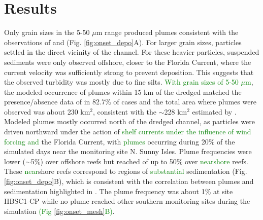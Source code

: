 \documentclass[preprint,12pt,authoryear]{elsarticle}
\newcommand{\modif}[1]{\textcolor{green}{#1}}
\begin{document}
\section{Results}

Only grain sizes in the 5-50 $\mu$m range produced plumes consistent with the observations of \cite{barnes2015sediment} and \cite{cunning2019extensive} (Fig. \ref{fig:onset_depo}A). For larger grain sizes, particles settled in the direct vicinity of the channel. For these heavier particles, suspended sediments were only observed offshore, closer to the Florida Current, where the current velocity was sufficiently strong to prevent deposition. This suggests that the observed turbidity was mostly due to fine silts. \modif{With grain sizes of 5-50 $\mu$m}, the modeled occurrence of plumes  within 15 km of the dredged matched the presence/absence data of \cite{cunning2019extensive} in 82.7\% of cases and the total area where plumes were observed was about 230 km$^2$, consistent with the $\sim$228 km$^2$ estimated by \cite{barnes2015sediment}. Modeled plumes mostly occurred north of the dredged channel, as particles were driven northward under the action of \modif{shelf currents under the influence of wind forcing and} the Florida Current, with \modif{plumes} occurring during 20\% of the simulated days near the monitoring site N. Sunny Isles. Plume frequencies were lower ($\sim$5\%) over offshore reefs but reached of up to 50\% over \modif{nearshore} reefs. These \modif{near}shore reefs correspond to regions of \modif{substantial} sedimentation (Fig. \ref{fig:onset_depo}B), which is consistent with the correlation between plumes and sedimentation highlighted in \cite{cunning2019extensive}. The plume frequency was about 1\% at site HBSC1-CP while no plume reached other southern monitoring sites during the simulation \modif{(Fig \ref{fig:onset_mesh}B)}. 

\end{document}
